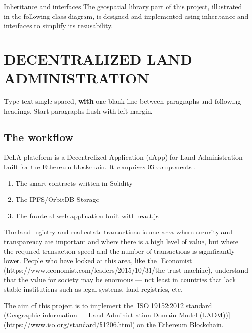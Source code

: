 \documentclass{isprs} %
\begin{document}
Inheritance and interfaces 
The geospatial library part of this project, illustrated in the following class diagram, is designed and implemented using inheritance and interfaces to simplify its resusability.


\newpage
\section{DECENTRALIZED LAND ADMINISTRATION}\label{sec:DECENTRALIZED LAND ADMINISTRATION}

Type text single-spaced, \textbf{with} one blank line between paragraphs and 
following headings. Start paragraphs flush with left margin.

\subsection{The workflow}\label{sec:The workflow}


DeLA plateform is a Decentrelized Application (dApp) for Land Administration built for the Ethereum blockchain. It comprises 03 components :


\begin{enumerate}
\setlength\itemsep{0em}\setlength\parskip{0em}\setlength\topsep{0em}\setlength\partopsep{0em}\setlength\parsep{0em} 
\item{The smart contracts written in Solidity} 
\item{The IPFS/OrbitDB Storage }
\item{The frontend web application built with react.js}
\end{enumerate}


The land registry and real estate transactions is one area where security and transparency are important and where there is a high level of value, but where the required transaction speed and the number of transactions is significantly lower. People who have looked at this area, like the [Economist](https://www.economist.com/leaders/2015/10/31/the-trust-machine), understand that the value for society may be enormous — not least in countries that lack stable institutions such as legal systems, land registries, etc.

The aim of this project is to implement the [ISO 19152:2012 standard (Geographic information — Land Administration Domain Model (LADM))](https://www.iso.org/standard/51206.html) on the Ethereum Blockchain.
\end{document}
